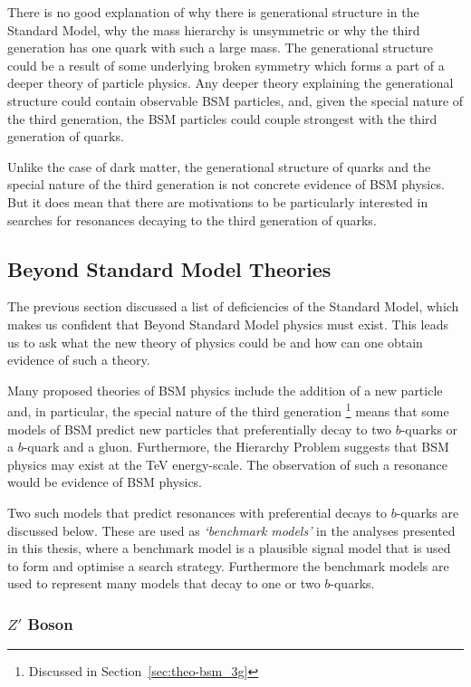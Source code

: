There is no good explanation of why there is generational structure in the Standard Model,
why the mass hierarchy is unsymmetric 
or why the third generation has one quark with such a large mass.
The generational structure could be a result of some underlying broken symmetry
which forms a part of a deeper theory of particle physics.
Any deeper theory explaining the generational structure could contain observable BSM particles,
and, given the special nature of the third generation,
the BSM particles could couple strongest with the third generation of quarks.

Unlike the case of dark matter,
the generational structure of quarks
and the special nature of the third generation is not concrete evidence of BSM physics.
But it does mean that there are motivations to be particularly interested in
searches for resonances decaying to the third generation of quarks.

\subsection{Beyond Standard Model Theories}
\label{sec:theo-bsm_models}

The previous section discussed a list of deficiencies of the Standard Model,
which makes us confident that Beyond Standard Model physics must exist.
This leads us to ask what the new theory of physics could be and
how can one obtain evidence of such a theory.

Many proposed theories of BSM physics include the addition of a new particle and,
in particular, the special nature of the third generation
\footnote{Discussed in Section~\ref{sec:theo-bsm_3g}}
means that some models of BSM predict new particles
that preferentially decay to two $b$-quarks or a $b$-quark and a gluon.
Furthermore, the Hierarchy Problem suggests that BSM physics may exist at the TeV energy-scale.
The observation of such a resonance would be evidence of BSM physics.

Two such models that predict resonances with preferential decays to $b$-quarks are discussed below.
These are used as \textit{`benchmark models'} in the analyses presented in this thesis,
where a benchmark model is a plausible signal model that is used to form and optimise a search strategy.
Furthermore the benchmark models are used to represent many models that decay to one or two $b$-quarks.

\subsubsection{$Z'$ Boson}
\label{sec:theo-bsm_zprime}

